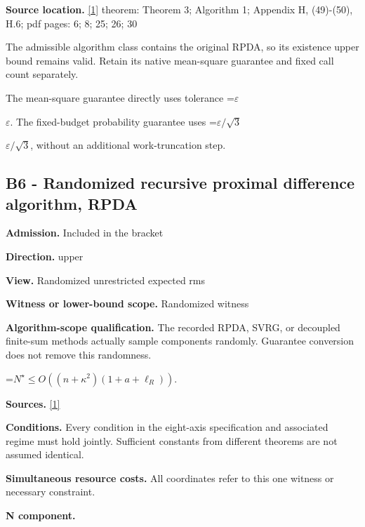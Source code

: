 \documentclass[10pt,a4paper]{article}
\newcommand{\AtlasMath}[1]{\par\begingroup\centering\setbox0=\hbox{$\displaystyle #1$}\ifdim\wd0>1.4\linewidth\typeout{ATLAS WIDE FORMULA: \the\wd0}\fi\ifdim\wd0>\linewidth\resizebox{\linewidth}{!}{\box0}\else\box0\fi\par\endgroup}
\newcommand{\AtlasInlineMath}[1]{\begingroup\setbox0=\hbox{$#1$}\ifdim\wd0>.4\linewidth\endgroup\AtlasMath{#1}\else\endgroup$#1$\fi}
\begin{document}
\textbf{Source location.} \href{https://arxiv.org/pdf/2610.04944v1}{[1]} theorem: Theorem 3; Algorithm 1; Appendix H, (49)-(50), H.6; pdf pages: 6; 8; 25; 26; 30



The admissible algorithm class contains the original RPDA, so its existence upper bound remains valid. Retain its native mean-square guarantee and fixed call count separately.



The mean-square guarantee directly uses tolerance \AtlasInlineMath{\varepsilon}. The fixed-budget probability guarantee uses \AtlasInlineMath{\varepsilon/\sqrt3}, without an additional work-truncation step.



\subsection{B6 - Randomized recursive proximal difference algorithm, RPDA}


\textbf{Admission.} Included in the bracket



\textbf{Direction.} upper



\textbf{View.} Randomized unrestricted expected rms



\textbf{Witness or lower-bound scope.} Randomized witness



\textbf{Algorithm-scope qualification.} The recorded RPDA, SVRG, or decoupled finite-sum methods actually sample components randomly. Guarantee conversion does not remove this randomness.



\AtlasMath{N^\star\le O\!\left((n+\kappa^2)(1+a+\ell_R)\right).}


\textbf{Sources.} \href{https://arxiv.org/pdf/2610.04944v1}{[1]}



\textbf{Conditions.} Every condition in the eight-axis specification and associated regime must hold jointly. Sufficient constants from different theorems are not assumed identical.



\textbf{Simultaneous resource costs.} All coordinates refer to this one witness or necessary constraint.



\textbf{N component.}
\end{document}
